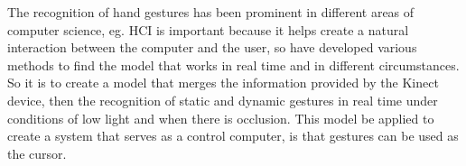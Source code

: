 The recognition of hand gestures has been prominent in different areas of computer science, eg. HCI is important because it helps create a natural interaction between the computer and the user, so have developed various methods to find the model that works in real time and in different circumstances. So it is to create a model that merges the information provided by the Kinect device, then the recognition of static and dynamic gestures in real time under conditions of low light and when there is occlusion. This model be applied to create a system that serves as a control computer, is that gestures can be used as the cursor.


